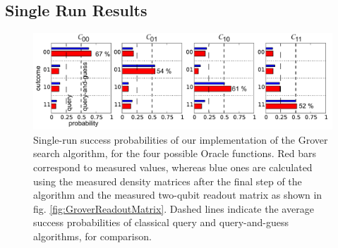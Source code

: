 \subsection{Single Run Results}

\begin{figure}[ht!]
	\centering
		\includegraphics[width=1.\textwidth]{"./data/ct5/2011_04_21 - grover and tomo/good_data/grover algorithm - single run probabilities"}
		\caption{Single-run success probabilities of our implementation of the Grover search algorithm, for the four possible Oracle functions. Red bars correspond to measured values, whereas blue ones are calculated using the measured density matrices after the final step of the algorithm and the measured two-qubit readout matrix as shown in fig. \ref{fig:GroverReadoutMatrix}. Dashed lines indicate the average success probabilities of classical query and query-and-guess algorithms, for comparison.}
	\label{fig:GroverSingleShotResults}
\end{figure}

